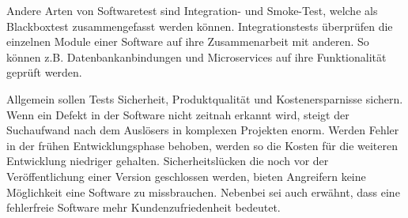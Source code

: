 Andere Arten von Softwaretest sind Integration- und Smoke-Test, welche als Blackboxtest zusammengefasst werden können.
Integrationstests überprüfen die einzelnen Module einer Software auf ihre Zusammenarbeit mit anderen.
So können z.B. Datenbankanbindungen und Microservices auf ihre Funktionalität geprüft werden.\cite{atlassian-testing}

Allgemein sollen Tests Sicherheit, Produktqualität und Kostenersparnisse sichern.
Wenn ein Defekt in der Software nicht zeitnah erkannt wird, steigt der Suchaufwand nach dem Auslösers in komplexen Projekten enorm.
Werden Fehler in der frühen Entwicklungsphase behoben, werden so die Kosten für die weiteren Entwicklung niedriger gehalten.
Sicherheitslücken die noch vor der Veröffentlichung einer Version geschlossen werden, bieten Angreifern keine Möglichkeit eine Software zu missbrauchen.
Nebenbei sei auch erwähnt, dass eine fehlerfreie Software mehr Kundenzufriedenheit bedeutet.\cite{stm-testing}
